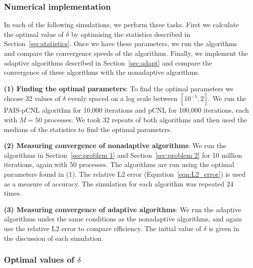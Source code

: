 \documentclass[final]{siamltex}
\begin{document}
\subsubsection{Numerical implementation}\label{sec:Implementation P1}

In each of the following simulations, we perform three tasks. First we calculate the optimal value of $\delta$ by optimising the statistics described in Section~\ref{sec:statistics}. Once we have these parameters, we run the algorithms and compare the convergence speeds of the algorithms. Finally, we implement the adaptive algorithms described in Section~\ref{sec:adapt} and compare the convergence of these algorithms with the nonadaptive algorithms.

{\bf (1) Finding the optimal parameters}: To find the optimal
parameters we choose 32 values of $\delta$ evenly spaced on a log scale
between $[10^{-5}, 2]$. We run the PAIS-pCNL algorithm for 10,000 iterations and pCNL for 100,000 iterations, each with $M=50$ processes. We took 32 repeats of both algorithms and then used the medians of the statistics to find the optimal parameters.

{\bf (2) Measuring convergence of nonadaptive algorithms}: We run the algorithms in Section~\ref{sec:problem 1} and Section~\ref{sec:problem 2} for 10 million iterations, again with 50 processes. The algorithms are run using the optimal parameters found in (1). The relative L2 error (Equation~\ref{eqn:L2_error}) is used as a measure of accuracy. The simulation for each algorithm was repeated 24 times.

{\bf (3) Measuring convergence of adaptive algorithms}: We run the
adaptive algorithms under the same conditions as the nonadaptive
algorithms, and again use the relative L2 error to compare
efficiency. The initial value of $\delta$ is given in the discussion
of each simulation.


\subsubsection{Optimal values of $\delta$}\label{sec:Optimal values P1}
\end{document}
